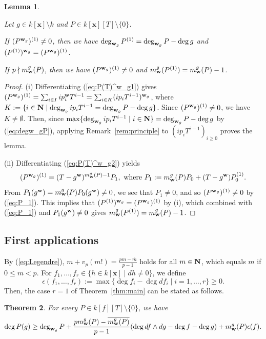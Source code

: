 \documentclass{amsart}
\theoremstyle{plain}
\newtheorem{thm}{Theorem}[section]
\newtheorem{lem}[thm]{Lemma}
\theoremstyle{definition}
\newcommand{\zs}{\{ 0\} }
\newcommand{\sm}{\setminus}
\newcommand{\nd}{\noindent}
\newcommand{\ol}{\overline}
\newcommand{\N}{{\bf N}}
\newcommand{\ep}{\epsilon}
\newcommand{\x}{{\boldsymbol x}}
\newcommand{\w}{{\bf w}}
\newcommand{\kx}{k[\x]}
\begin{document}
\begin{lem}\label{lem:p nmid m(P)}

Let $g\in \kx \sm k$ and $P\in \kx [T]\sm \zs $. 


\nd{\rm (i)} 
If $(P^{\w _g})^{(1)}\ne 0$, then we have 
$\deg _{\w _g}P^{(1)}=\deg _{\w _g}P-\deg g$ 
and $(P^{(1)})^{\w _g}=(P^{\w _g})^{(1)}$. 

\nd{\rm (ii)} 
If $p\nmid m_{\w }^g(P)$, then we have 
$(P^{\w _g})^{(1)}\ne 0$ 
and $m_{\w }^g(P^{(1)})=m_{\w }^g(P)-1$. 
\end{lem}
\begin{proof}
\!(i) 
Differentiating (\ref{eq:P(T)^w_g1}) gives 
$(P^{\w _g})^{(1)}=\sum _{i\in I}ip_i^{\w }T^{i-1}
=\sum _{i\in K}(ip_iT^{i-1})^{\w _g}$, 
where $K:=
\{ i\in \N \mid \deg _{\w _g}ip_iT^{i-1}=\deg _{\w _g}P-\deg g\} $. 
Since $(P^{\w _g})^{(1)}\ne 0$, 
we have $K\ne \emptyset $. 
Then, 
since 
$\max \{ \deg _{\w _g}ip_iT^{i-1}\mid i\in \N \} =\deg _{\w _g}P-\deg g$ 
by (\ref{eq:degw_gP}), 
applying Remark~\ref{rem:principle} to $(ip_iT^{i-1})_{i\ge 0}$ 
proves the lemma. 


(ii) 
Differentiating (\ref{eq:P(T)^w_g2}) yields 
\begin{equation}\label{eq:P_1}
(P^{\w _g})^{(1)}=(T-g^{\w })^{m_{\w }^g(P)-1}P_1, 
\text{ where }
P_1:=m_{\w }^g(P)P_0+(T-g^{\w })P_0^{(1)}. 
\end{equation}
From $P_1(g^{\w })=m_{\w }^g(P)P_0(g^{\w })\ne 0$, 
we see that 
$P_1\ne 0$, 
and so $(P^{\w _g})^{(1)}\ne 0$ by (\ref{eq:P_1}). 
This implies that $(P^{(1)})^{\w _g}=(P^{\w _g})^{(1)}$ by (i), 
which combined with (\ref{eq:P_1}) and $P_1(g^{\w })\ne 0$ 
gives $m_{\w }^g(P^{(1)})=m_{\w }^g(P)-1$. 
\end{proof}





\subsection{First applications}\label{sect:1st conseq}
By (\ref{eq:Legendre}), 
$m+v_p(m!)=\frac{pm-\ol{m}}{p-1}$ 
holds for all $m\in \N $, 
which equals $m$ if $0\le m<p$. 
For $f_1,\ldots ,f_r\in \{ h\in \kx \mid dh\ne 0\} $, 
we define 
$$
\ep (f_1,\ldots ,f_r):=
\max \{ \deg f_i-\deg df_i\mid i=1,\ldots ,r\} \ge 0. 
$$
Then, 
the case $r=1$ of Theorem~\ref{thm:main} 
can be stated as follows. 


\begin{thm}\label{thm:pSUineq0}
For every $P\in k[f][T]\sm \zs $, we have 
$$
\deg P(g)\ge \deg _{\w _g}P
+\frac{pm_{\w }^g(P)-\ol{m_{\w }^g(P)}}{p-1}
(\deg df\wedge dg-\deg f-\deg g)+m_{\w }^g(P)\ep (f).
$$
\end{thm}
\end{document}
